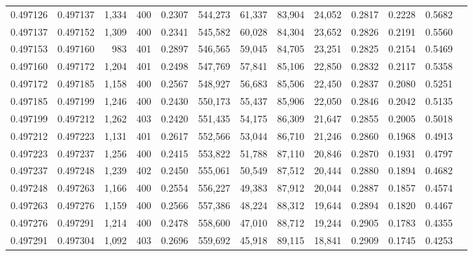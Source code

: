 \begin{tabular}{rrrrrrrrrrrrr}
0.497126 & 0.497137 & 1,334 & 400 &                                     0.2307 & 544,273 &  61,337 &  83,904 &  24,052 & 0.2817 & 0.2228 & 0.5682 \\
0.497137 & 0.497152 & 1,309 & 400 &                                     0.2341 & 545,582 &  60,028 &  84,304 &  23,652 & 0.2826 & 0.2191 & 0.5560 \\
0.497153 & 0.497160 &   983 & 401 &                                     0.2897 & 546,565 &  59,045 &  84,705 &  23,251 & 0.2825 & 0.2154 & 0.5469 \\
0.497160 & 0.497172 & 1,204 & 401 &                                     0.2498 & 547,769 &  57,841 &  85,106 &  22,850 & 0.2832 & 0.2117 & 0.5358 \\
0.497172 & 0.497185 & 1,158 & 400 &                                     0.2567 & 548,927 &  56,683 &  85,506 &  22,450 & 0.2837 & 0.2080 & 0.5251 \\
0.497185 & 0.497199 & 1,246 & 400 &                                     0.2430 & 550,173 &  55,437 &  85,906 &  22,050 & 0.2846 & 0.2042 & 0.5135 \\
0.497199 & 0.497212 & 1,262 & 403 &                                     0.2420 & 551,435 &  54,175 &  86,309 &  21,647 & 0.2855 & 0.2005 & 0.5018 \\
0.497212 & 0.497223 & 1,131 & 401 &                                     0.2617 & 552,566 &  53,044 &  86,710 &  21,246 & 0.2860 & 0.1968 & 0.4913 \\
0.497223 & 0.497237 & 1,256 & 400 &                                     0.2415 & 553,822 &  51,788 &  87,110 &  20,846 & 0.2870 & 0.1931 & 0.4797 \\
0.497237 & 0.497248 & 1,239 & 402 &                                     0.2450 & 555,061 &  50,549 &  87,512 &  20,444 & 0.2880 & 0.1894 & 0.4682 \\
0.497248 & 0.497263 & 1,166 & 400 &                                     0.2554 & 556,227 &  49,383 &  87,912 &  20,044 & 0.2887 & 0.1857 & 0.4574 \\
0.497263 & 0.497276 & 1,159 & 400 &                                     0.2566 & 557,386 &  48,224 &  88,312 &  19,644 & 0.2894 & 0.1820 & 0.4467 \\
0.497276 & 0.497291 & 1,214 & 400 &                                     0.2478 & 558,600 &  47,010 &  88,712 &  19,244 & 0.2905 & 0.1783 & 0.4355 \\
0.497291 & 0.497304 & 1,092 & 403 &                                     0.2696 & 559,692 &  45,918 &  89,115 &  18,841 & 0.2909 & 0.1745 & 0.4253 \\

\end{tabular}
